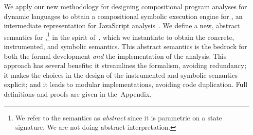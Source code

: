 
We apply our new methodology for designing compositional program analyses for dynamic languages to obtain a compositional symbolic execution engine for \jsil, an intermediate representation for JavaScript analysis~\cite{javert}.
%
%
%
%
We define a new, abstract semantics for \jsil,\footnote{We refer to the semantics as \emph{abstract} since it 
is parametric on a \jsil state signature. We are not doing abstract interpretation.} in the spirit %
 of~\cite{vanhorn:icfp:2010}, which we instantiate to obtain the concrete, instrumented, and symbolic semantics. 
This abstract semantics is the bedrock for both the formal development \emph{and} the implementation of the analysis. This approach has several benefits: it streamlines the formalism, avoiding redundancy; it makes the choices in the design of the instrumented and symbolic semantics explicit; and it leads to modular implementations, avoiding code duplication.
%
Full definitions and proofs are given in the~Appendix.


